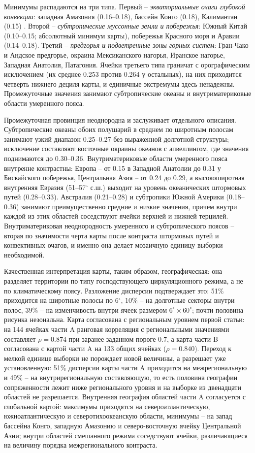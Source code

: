 \documentclass[12pt,a4paper]{article}
\begin{document}
Минимумы распадаются на три типа. Первый -- \emph{экваториальные очаги глубокой конвекции}: западная Амазония (0.16--0.18), бассейн Конго (0.18), Калимантан (0.15) \cite{NealeSlingo2003,Feng2021}. Второй -- \emph{субтропические муссонные земли и побережья}: Южный Китай (0.10--0.15; абсолютный минимум карты), побережья Красного моря и Аравии (0.14--0.18). Третий -- \emph{предгорья и подветренные зоны горных систем}: Гран-Чако и Андское предгорье, окраина Мексиканского нагорья, Иранское нагорье, Западная Анатолия, Патагония. Ячейки третьего типа граничат с орографическим исключением (их среднее 0.253 против 0.264 у остальных), на них приходится четверть нижнего дециля карты, и единичные экстремумы здесь ненадежны. Промежуточные значения занимают субтропические океаны и внутриматериковые области умеренного пояса.

Промежуточная провинция неоднородна и заслуживает отдельного описания. Субтропические океаны обоих полушарий в среднем по широтным полосам занимают узкий диапазон 0.25--0.27 без выраженной долготной структуры; исключение составляют восточные окраины океанов с апвеллингом, где значения поднимаются до 0.30--0.36. Внутриматериковые области умеренного пояса внутренне контрастны: Европа -- от 0.15 в Западной Анатолии до 0.31 у Бискайского побережья, Центральная Азия -- от 0.24 до 0.29, а высокоширотная внутренняя Евразия (51--57$^\circ$ с.ш.) выходит на уровень океанических штормовых путей (0.28--0.33). Австралия (0.21--0.28) и субтропики Южной Америки (0.18--0.36) занимают преимущественно средние и низкие значения, причем внутри каждой из этих областей соседствуют ячейки верхней и нижней терцилей. Внутриматериковая неоднородность умеренного и субтропического поясов -- вторая по значимости черта карты после контраста штормовых путей и конвективных очагов, и именно она делает мозаичную единицу выборки необходимой.

Качественная интерпретация карты, таким образом, географическая: она разделяет территории по типу господствующего циркуляционного режима, а не по климатическому поясу. Разложение дисперсии подтверждает это: 51\% приходится на широтные полосы по 6$^\circ$, 10\% -- на долготные секторы внутри полос, 39\% -- на изменчивость внутри ячеек размером $6^\circ \times 60^\circ$; почти половина рисунка незональна. Карта согласована с региональным уровнем первой статьи: на 144 ячейках части A ранговая корреляция с региональными значениями составляет $\rho = 0.874$ при заранее заданном пороге 0.7, а карта части B согласована с картой части A на 133 общих ячейках ($\rho = 0.840$). Переход к мелкой единице выборки не порождает новой величины, а разрешает уже установленную: 51\% дисперсии карты части A приходится на межрегиональную и 49\% -- на внутрирегиональную составляющую, то есть половина географии сопряженности лежит ниже регионального уровня и на выборке из двенадцати областей не разрешается. Внутренняя география областей части A согласуется с глобальной картой: максимумы приходятся на североатлантическую, южноатлантическую и северотихоокеанскую области, минимумы -- на запад бассейна Конго, западную Амазонию и северо-восточную ячейку Центральной Азии; внутри областей смешанного режима соседствуют ячейки, различающиеся на величину порядка межрегионального контраста.
\end{document}

